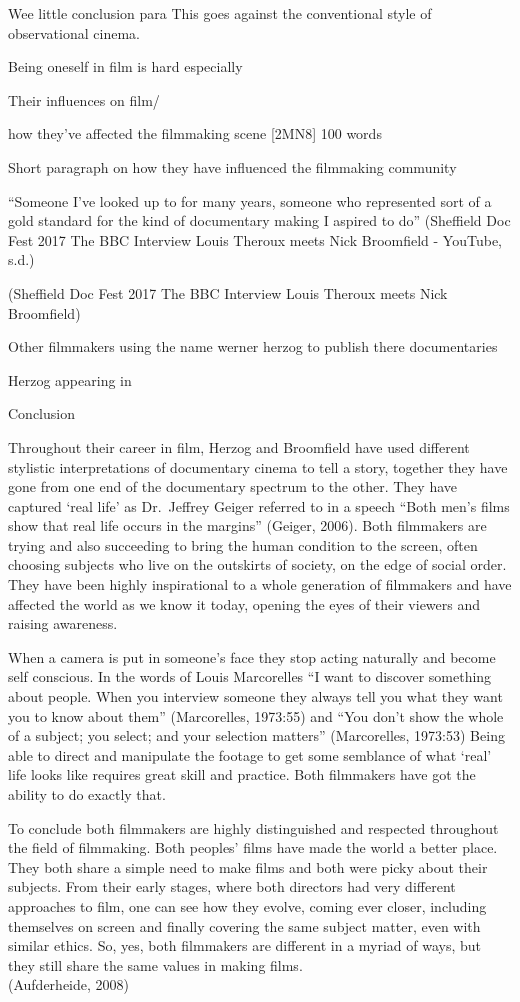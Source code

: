 \documentclass[
  12pt,
]{book}
\begin{document}
Wee little conclusion para This goes against the conventional style of observational cinema.

Being oneself in film is hard especially

Their influences on film/

how they've affected the filmmaking scene {[}2MN8{]} 100 words

Short paragraph on how they have influenced the filmmaking community

``Someone I've looked up to for many years, someone who represented sort of a gold standard for the kind of documentary making I aspired to do'' (Sheffield Doc Fest 2017 The BBC Interview Louis Theroux meets Nick Broomfield - YouTube, s.d.)

(Sheffield Doc Fest 2017 The BBC Interview Louis Theroux meets Nick Broomfield)

Other filmmakers using the name werner herzog to publish there documentaries

Herzog appearing in

Conclusion

Throughout their career in film, Herzog and Broomfield have used different stylistic interpretations of documentary cinema to tell a story, together they have gone from one end of the documentary spectrum to the other. They have captured `real life' as Dr.~Jeffrey Geiger referred to in a speech ``Both men's films show that real life occurs in the margins'' (Geiger, 2006). Both filmmakers are trying and also succeeding to bring the human condition to the screen, often choosing subjects who live on the outskirts of society, on the edge of social order. They have been highly inspirational to a whole generation of filmmakers and have affected the world as we know it today, opening the eyes of their viewers and raising awareness.

When a camera is put in someone's face they stop acting naturally and become self conscious. In the words of Louis Marcorelles ``I want to discover something about people. When you interview someone they always tell you what they want you to know about them'' (Marcorelles, 1973:55) and ``You don't show the whole of a subject; you select; and your selection matters'' (Marcorelles, 1973:53) Being able to direct and manipulate the footage to get some semblance of what `real' life looks like requires great skill and practice. Both filmmakers have got the ability to do exactly that.

To conclude both filmmakers are highly distinguished and respected throughout the field of filmmaking. Both peoples' films have made the world a better place. They both share a simple need to make films and both were picky about their subjects. From their early stages, where both directors had very different approaches to film, one can see how they evolve, coming ever closer, including themselves on screen and finally covering the same subject matter, even with similar ethics. So, yes, both filmmakers are different in a myriad of ways, but they still share the same values in making films.\\
(Aufderheide, 2008)
\end{document}

